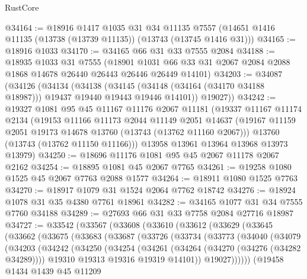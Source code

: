 \begin{lexlean}{RustCore}
\begin{coremodule}
@34164 := @18916
    @1417
    @1035
    @31
    @34
    @11135
    @7557
    (@14651 @1416 @11135 (@13738 (@13739 @11135)) (@13743 (@13745 @1416 @31)))
@34165 := @18916 @1033
@34170 := @34165 @66 @31 @33 @7555 @2084
@34188 := @18935
    @1033
    @31
    @7555
    (@18901 @1031 @66 @33 @31 @2067 @2084 @2088 @1868 @14678 @26440 @26443 @26446 @26449 @14101)
@34203 := @34087
    (@34126
      (@34134
        (@34138
          (@34145 (@34148 (@34164 (@34170 @34188 @18987))) @19437 @19440 @19443 @19446 @14101))
        @19027))
@34242 := @19327
    @1081
    @95
    @45
    @11167
    @11176
    @2067
    @11181
    (@19337
      @11167
      @11174
      @2134
      (@19153
        @11166
        @11173
        @2044
        @11149
        @2051
        @14637
        (@19167 @11159 @2051 @19173 @14678 @13760 (@13743 (@13762 @11160 @2067)))
        @13760
        (@13743 (@13762 @11150 @11166)))
      @13958
      @13961
      @13964
      @13968
      @13973
      @13979)
@34250 := @18696 @11176 @1081 @95 @45 @2067 @11178 @2067 @2162
@34254 := @18895 @1081 @45 @2067 @7765
@34261 := @19258 @1080 @1525 @45 @2067 @7763 @2088 @1577
@34264 := @18911 @1080 @1525 @7763
@34270 := @18917 @1079 @31 @1524 @2064 @7762 @18742
@34276 := @18924 @1078 @31 @35 @4380 @7761 @18961
@34282 := @34165 @1077 @31 @34 @7555 @7760 @34188
@34289 := @27693 @66 @31 @33 @7758 @2084 @27716 @18987
@34727 := @33542
    (@33567
      (@33608
        (@33610
          (@33612
            (@33629
              (@33645
                (@33662
                  (@33675
                    (@33683
                      (@33687
                        (@33726
                          (@33734
                            (@33773
                              (@34040
                                (@34079
                                  (@34203
                                    (@34242
                                      (@34250
                                        (@34254
                                          (@34261
                                            (@34264 (@34270 (@34276 (@34282 @34289))))
                                            @19310
                                            @19313
                                            @19316
                                            @19319
                                            @14101))
                                        @19027))))))
                            (@19458
                              @1434
                              @1439
                              @45
                              @11209

\end{coremodule}
\end{lexlean}
